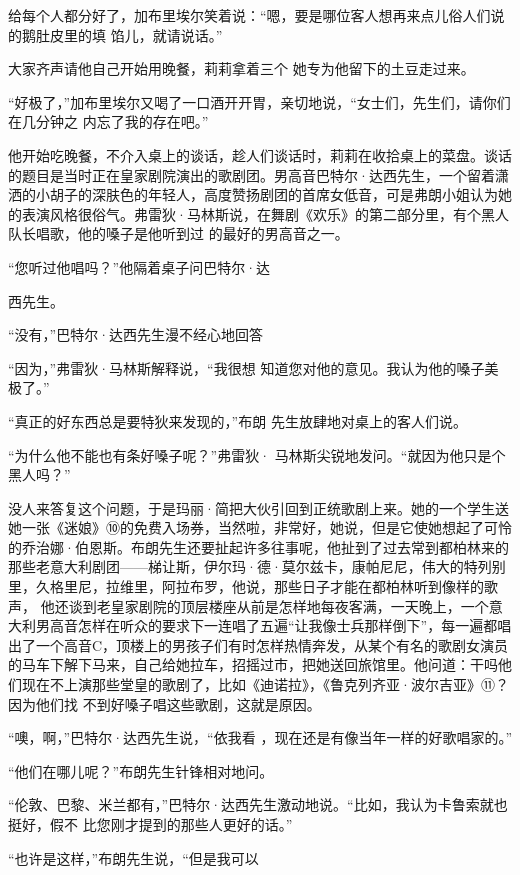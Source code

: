 \documentclass{article}
\begin{document}
\newpage

给每个人都分好了，加布里埃尔笑着说：“嗯，要是哪位客人想再来点儿俗人们说的鹅肚皮里的填
馅儿，就请说话。” 

大家齐声请他自己开始用晚餐，莉莉拿着三个
她专为他留下的土豆走过来。 

“好极了，”加布里埃尔又喝了一口酒开开胃，亲切地说，“女士们，先生们，请你们在几分钟之
内忘了我的存在吧。” 

他开始吃晚餐，不介入桌上的谈话，趁人们谈话时，莉莉在收拾桌上的菜盘。谈话的题目是当时正在皇家剧院演出的歌剧团。男高音巴特尔·达西先生，一个留着潇洒的小胡子的深肤色的年轻人，高度赞扬剧团的首席女低音，可是弗朗小姐认为她的表演风格很俗气。弗雷狄·马林斯说，在舞剧《欢乐》的第二部分里，有个黑人队长唱歌，他的嗓子是他听到过
的最好的男高音之一。 

“您听过他唱吗？”他隔着桌子问巴特尔·达
\newpage

西先生。 

“没有，”巴特尔·达西先生漫不经心地回答

“因为，”弗雷狄·马林斯解释说，“我很想
知道您对他的意见。我认为他的嗓子美极了。” 

“真正的好东西总是要特狄来发现的，”布朗
先生放肆地对桌上的客人们说。 

“为什么他不能也有条好嗓子呢？”弗雷狄·
马林斯尖锐地发问。“就因为他只是个黑人吗？” 

没人来答复这个问题，于是玛丽·简把大伙引回到正统歌剧上来。她的一个学生送她一张《迷娘》⑩的免费入场券，当然啦，非常好，她说，但是它使她想起了可怜的乔治娜·伯恩斯。布朗先生还要扯起许多往事呢，他扯到了过去常到都柏林来的那些老意大利剧团——梯让斯，伊尔玛·德·莫尔兹卡，康帕尼尼，伟大的特列别里，久格里尼，拉维里，阿拉布罗，他说，那些日子才能在都柏林听到像样的歌声，
\newpage
他还谈到老皇家剧院的顶层楼座从前是怎样地每夜客满，一天晚上，一个意大利男高音怎样在听众的要求下一连唱了五遍“让我像士兵那样倒下”，每一遍都唱出了一个高音C，顶楼上的男孩子们有时怎样热情奔发，从某个有名的歌剧女演员的马车下解下马来，自己给她拉车，招摇过市，把她送回旅馆里。他问道：干吗他们现在不上演那些堂皇的歌剧了，比如《迪诺拉》，《鲁克列齐亚·波尔吉亚》⑪？因为他们找
不到好嗓子唱这些歌剧，这就是原因。 

“噢，啊，”巴特尔·达西先生说，“依我看
，现在还是有像当年一样的好歌唱家的。” 

“他们在哪儿呢？”布朗先生针锋相对地问。

“伦敦、巴黎、米兰都有，”巴特尔·达西先生激动地说。“比如，我认为卡鲁索就也挺好，假不
比您刚才提到的那些人更好的话。” 

“也许是这样，”布朗先生说，“但是我可以
\end{document}
